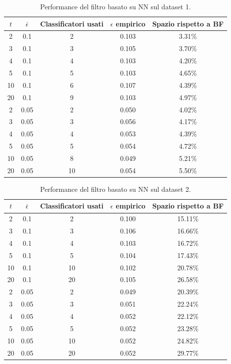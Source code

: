 \begin{table}
    \centering
    \begin{tabular}{|c|c|c|c|c|}
        \hline
        $t$  & $\bar\epsilon$ & Classificatori usati & $\epsilon$ empirico & Spazio rispetto a BF \\ 
        \hline
        2   & 0.1  & 2  & 0.103 & 3.31\% \\ 
        3   & 0.1  & 3  & 0.105 & 3.70\% \\ 
        4   & 0.1  & 4  & 0.103 & 4.20\% \\ 
        5   & 0.1  & 5  & 0.103 & 4.65\% \\  
        10  & 0.1  & 6  & 0.107 & 4.39\% \\  
        20  & 0.1  & 9  & 0.103 & 4.97\% \\  
        2   & 0.05 & 2  & 0.050 & 4.02\% \\ 
        3   & 0.05 & 3  & 0.056 & 4.17\% \\ 
        4   & 0.05 & 4  & 0.053 & 4.39\% \\ 
        5   & 0.05 & 5  & 0.054 & 4.72\% \\  
        10  & 0.05 & 8  & 0.049 & 5.21\% \\  
        20  & 0.05 & 10 & 0.054 & 5.50\% \\  
        \hline
    \end{tabular}
    \caption{Performance del filtro basato su NN sul dataset 1.}
    \label{tab:performance-ds1-mlp}
\end{table}
\begin{table}
    \centering
    \begin{tabular}{|c|c|c|c|c|}
        \hline
        $t$  & $\bar\epsilon$ & Classificatori usati & $\epsilon$ empirico & Spazio rispetto a BF \\ 
        \hline
        2   & 0.1  & 2  & 0.100 & 15.11\% \\ 
        3   & 0.1  & 3  & 0.106 & 16.66\% \\ 
        4   & 0.1  & 4  & 0.103 & 16.72\% \\ 
        5   & 0.1  & 5  & 0.104 & 17.43\% \\  
        10  & 0.1  & 10 & 0.102 & 20.78\% \\  
        20  & 0.1  & 20 & 0.105 & 26.58\% \\  
        2   & 0.05 & 2  & 0.049 & 20.39\% \\ 
        3   & 0.05 & 3  & 0.051 & 22.24\% \\ 
        4   & 0.05 & 4  & 0.052 & 22.12\% \\ 
        5   & 0.05 & 5  & 0.052 & 23.28\% \\  
        10  & 0.05 & 10 & 0.052 & 24.82\% \\  
        20  & 0.05 & 20 & 0.052 & 29.77\% \\  
        \hline
    \end{tabular}
    \caption{Performance del filtro basato su NN sul dataset 2.}
    \label{tab:performance-ds2-mlp}
\end{table}
